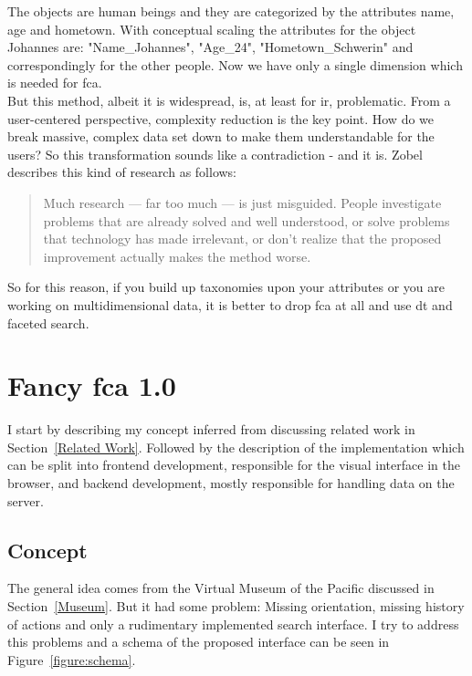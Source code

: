 \documentclass[11pt]{report}
\begin{document}
The objects are human beings and they are categorized by the attributes name, age and hometown. With conceptual scaling  the attributes for the object Johannes are: "Name\_Johannes", "Age\_24", "Hometown\_Schwerin" and correspondingly for the other people. Now we have only a single dimension which is needed for \acrshort{fca}. \\

But this method, albeit it is widespread, is, at least for \acrshort{ir}, problematic. From a user-centered perspective, complexity reduction is the key point. How do we break massive, complex data set down to make them understandable for the users? So this transformation sounds like a contradiction - and it is. Zobel describes this kind of research as follows:

\begin{quote}
Much research — far too much — is just misguided. People investigate problems that are already solved and well understood, or solve problems that technology has made irrelevant, or don’t realize that the proposed improvement actually makes the method worse.
\end{quote}

So for this reason, if you build up taxonomies upon your attributes or you are working on multidimensional data, it is better to drop \acrshort{fca} at all and use \acrshort{dt} and faceted search.


\chapter{Fancy \acrshort{fca} 1.0}
\label{Fancy 1.0}

I start by describing my concept inferred from discussing related work in Section~\ref{Related Work}. Followed by the description of the implementation which can be split into frontend development, responsible for the visual interface in the browser, and backend development, mostly responsible for handling data on the server.

\section{Concept}

The general idea comes from the Virtual Museum of the Pacific discussed in Section~\ref{Museum}. But it had some problem: Missing orientation, missing history of actions and only a rudimentary implemented search interface. I try to address this problems and a schema of the proposed interface can be seen in Figure~\ref{figure:schema}.
\end{document}
